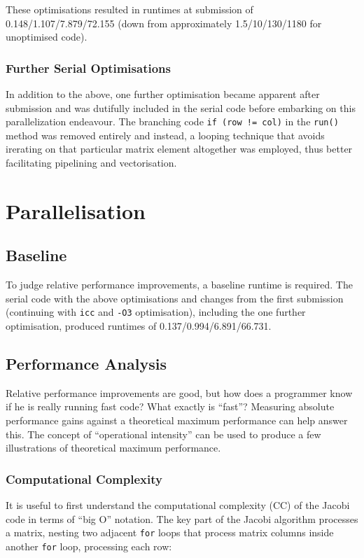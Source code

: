 \documentclass{article}
\begin{document}
These optimisations resulted in runtimes at submission of
0.148/1.107/7.879/72.155 (down from approximately 1.5/10/130/1180 for
unoptimised code).

\subsubsection{Further Serial Optimisations}
In addition to the above, one further optimisation became apparent
after submission and was dutifully included in the serial code before
embarking on this parallelization endeavour. The branching code
\texttt{if (row != col)} in the \texttt{run()} method was removed
entirely and instead, a looping technique that avoids irerating on
that particular matrix element altogether was employed, thus better
facilitating pipelining and vectorisation.

\section{Parallelisation}

\subsection{Baseline}
To judge relative performance improvements, a baseline runtime is
required. The serial code with the above optimisations and changes
from the first submission (continuing with \texttt{icc} and
\texttt{-O3} optimisation), including the one further optimisation,
produced runtimes of 0.137/0.994/6.891/66.731.

\subsection{Performance Analysis}
Relative performance improvements are good, but how does a programmer
know if he is really running fast code? What exactly is ``fast''?
Measuring absolute performance gains against a theoretical maximum
performance can help answer this. The concept of ``operational
intensity'' can be used to produce a few illustrations of
theoretical maximum performance.

\subsubsection{Computational Complexity}
It is useful to first understand the computational complexity (CC) of
the Jacobi code in terms of ``big O'' notation. The key part of the
Jacobi algorithm processes a matrix, nesting two adjacent \texttt{for}
loops that process matrix columns inside another \texttt{for} loop,
processing each row:
\end{document}
